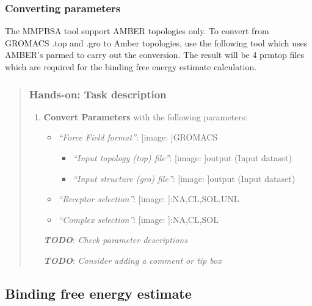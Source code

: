 \documentclass[twocolumn]{bmcart}%
\def\texttt{[image: ]}
\providecommand{\tightlist}{%
  \setlength{\itemsep}{0pt}\setlength{\parskip}{0pt}}
\begin{document}
\hypertarget{converting-parameters}{%
\subsubsection{Converting parameters}\label{converting-parameters}}

The MMPBSA tool support AMBER topologies only. To convert from GROMACS
.top and .gro to Amber topologies, use the following tool which uses
AMBER's parmed to carry out the conversion. The result will be 4 prmtop
files which are required for the binding free energy estimate
calculation.

\begin{quote}
\hypertarget{hands-on-task-description-17}{%
\subsubsection{Hands-on: Task
description}\label{hands-on-task-description-17}}

\begin{enumerate}
\def\labelenumi{\arabic{enumi}.}
\tightlist
\item
  \textbf{Convert Parameters} with the following parameters:

  \begin{itemize}
  \tightlist
  \item
    \emph{``Force Field format''}: \texttt{GROMACS}

    \begin{itemize}
    \tightlist
    \item
      \emph{``Input topology (top) file''}: \texttt{output} (Input
      dataset)
    \item
      \emph{``Input structure (gro) file''}: \texttt{output} (Input
      dataset)
    \end{itemize}
  \item
    \emph{``Receptor selection''}: \texttt{:NA,CL,SOL,UNL}
  \item
    \emph{``Complex selection''}: \texttt{:NA,CL,SOL}
  \end{itemize}

  \textbf{\emph{TODO}}: \emph{Check parameter descriptions}

  \textbf{\emph{TODO}}: \emph{Consider adding a comment or tip box}
\end{enumerate}
\end{quote}

\hypertarget{binding-free-energy-estimate}{%
\subsection{Binding free energy
estimate}\label{binding-free-energy-estimate}}
\end{document}
